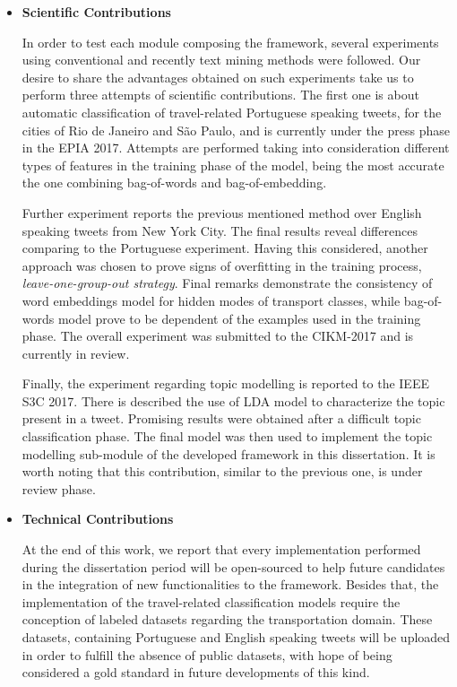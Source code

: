 \begin{itemize}
	\item \textbf{Scientific Contributions}
	
	 In order to test each module composing the framework, several experiments using conventional and recently text mining methods were followed. Our desire to share the advantages obtained on such experiments take us to perform three attempts of scientific contributions. The first one is about automatic classification of travel-related Portuguese speaking tweets, for the cities of Rio de Janeiro and São Paulo, and is currently under the press phase in the EPIA 2017. Attempts are performed taking into consideration different types of features in the training phase of the model, being the most accurate the one combining bag-of-words and bag-of-embedding.
	
	Further experiment reports the previous mentioned method over English speaking tweets from New York City. The final results reveal differences comparing to the Portuguese experiment. Having this considered, another approach was chosen to prove signs of overfitting in the training process, \textit{leave-one-group-out strategy}. Final remarks demonstrate the consistency of word embeddings model for hidden modes of transport classes, while bag-of-words model prove to be dependent of the examples used in the training phase. The overall experiment was submitted to the CIKM-2017 and is currently in review.
	
	Finally, the experiment regarding topic modelling is reported to the IEEE S3C 2017. There is described the use of LDA model to characterize the topic present in a tweet. Promising results were obtained after a difficult topic classification phase. The final model was then used to implement the topic modelling sub-module of the developed framework in this dissertation. It is worth noting that this contribution, similar to the previous one, is under review phase.
	
	\item \textbf{Technical Contributions}
	
	At the end of this work, we report that every implementation performed during the dissertation period will be open-sourced to help future candidates in the integration of new functionalities to the framework. Besides that, the implementation of the travel-related classification models require the conception of labeled datasets regarding the transportation domain. These datasets, containing Portuguese and English speaking tweets will be uploaded in order to fulfill the absence of public datasets, with hope of being considered a gold standard in future developments of this kind.


\end{itemize}
